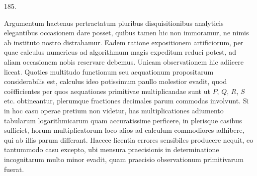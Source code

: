 \begin{center}\hypertarget{native-258-article185}{}185.\end{center}
Argumentum hactenus pertractatum pluribus disquisitionibus analyticis
elegantibus occasionem dare posset, quibus tamen hic non immoramur, ne
nimis ab instituto nostro distrahamur. Eadem ratione expositionem artificiorum,
per quae calculus numericus ad algorithmum magis expeditum reduci
potest, ad aliam occasionem nobis reservare debemus. Unicam observationem
hic adiicere liceat. Quoties multitudo functionum seu aequationum
propositarum considerabilis est, calculus ideo potissimum paullo molestior evadit, quod
coëfficientes per quos aequationes primitivae multiplicandae sunt ut $P$, $Q$, $R$,
$S$ etc. obtineantur, plerumque fractiones decimales parum commodas involvunt.
Si in hoc casu operae pretium non videtur, has multiplicationes adiumento
tabularum logarithmicarum quam accuratissime perficere, in plerisque casibus
sufficiet, horum multiplicatorum loco alios ad calculum commodiores adhibere,
qui ab illis parum differant. Haecce licentia errores sensibiles producere nequit,
eo tantummodo casu excepto, ubi mensura praecisionis in determinatione
incognitarum multo minor evadit, quam praecisio observationum primitivarum
fuerat.
